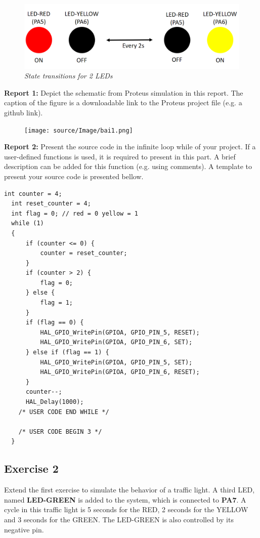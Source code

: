\begin{figure}[!htp]
    \centering
    \includegraphics[width=5in]{source/picture/bai_1/pic1.PNG}
    \caption{\textit{State transitions for 2 LEDs}}
    \label{bai1_pic1}
\end{figure}

\textbf{Report 1: }Depict the schematic from Proteus simulation in this report. The caption of the figure is a downloadable link to the Proteus project file (e.g. a github link).
\begin{figure}[!htp]
    \centering
    \texttt{[image: source/Image/bai1.png]}
\end{figure}

\textbf{Report 2: } Present the source code in the infinite loop while of your project. If a user-defined functions is used, it is required to present in this part. A brief description can be added for this function (e.g. using comments). A template to present your source code is presented bellow.

\begin{lstlisting}[caption=An example for your source code]
  int counter = 4;
  int reset_counter = 4;
  int flag = 0; // red = 0 yellow = 1
  while (1)
  {
	  if (counter <= 0) {
		  counter = reset_counter;
	  }
	  if (counter > 2) {
		  flag = 0;
	  } else {
		  flag = 1;
	  }
	  if (flag == 0) {
		  HAL_GPIO_WritePin(GPIOA, GPIO_PIN_5, RESET);
		  HAL_GPIO_WritePin(GPIOA, GPIO_PIN_6, SET);
	  } else if (flag == 1) {
		  HAL_GPIO_WritePin(GPIOA, GPIO_PIN_5, SET);
		  HAL_GPIO_WritePin(GPIOA, GPIO_PIN_6, RESET);
	  }
	  counter--;
	  HAL_Delay(1000);
    /* USER CODE END WHILE */

    /* USER CODE BEGIN 3 */
  }
\end{lstlisting}

\subsection{Exercise 2}
Extend the first exercise to simulate the behavior of a traffic light. A third LED, named \textbf{LED-GREEN} is added to the system, which is connected to \textbf{PA7}. A cycle in this traffic light is 5 seconds for the RED, 2 seconds for the YELLOW and 3 seconds for the GREEN. The LED-GREEN is also controlled by its negative pin.\\

